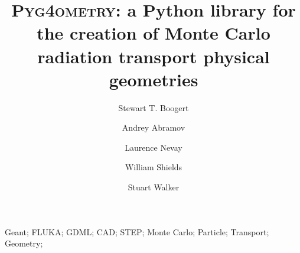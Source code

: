 \documentclass[final,5p,times,twocolumn]{elsarticle}
\newcommand{\PYGEOMETRY}{\textsc{Pyg4ometry}}
\begin{document}
\begin{frontmatter}



\title{\PYGEOMETRY{}: a Python library for the creation of Monte Carlo radiation transport physical geometries}


\author[a]{Stewart T. Boogert}
\author[a]{Andrey Abramov}
\author[a]{Laurence Nevay}
\author[a]{William Shields}
\author[a]{Stuart Walker}

\address[a]{John Adams Institute at Royal Holloway, Department of Physics, Royal Holloway, Egham, TW20 0EX, Surrey, UK}

\begin{abstract}
\end{abstract}

\begin{keyword}
Geant; FLUKA; GDML; CAD; STEP; Monte Carlo; Particle; Transport; Geometry; 

\end{keyword}

\end{frontmatter}



\linenumbers
\end{document}
